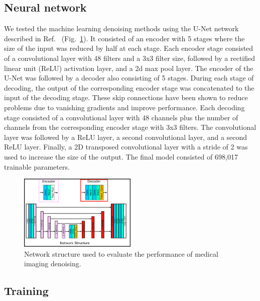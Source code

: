 \documentclass[12pt]{spieman}
\begin{document}
\begin{spacing}{2}
\subsection{Neural network}
We tested the machine learning denoising methods using the U-Net network described in Ref.~\cite{Lehtinen2018a} (Fig.~\ref{fig:netStructure}). It consisted of an encoder with 5 stages where the size of the input was reduced by half at each stage. Each encoder stage consisted of a convolutional layer with 48 filters and a 3x3 filter size, followed by a rectified linear unit (ReLU) activation layer, and a 2d max pool layer. The encoder of the U-Net was followed by a decoder also consisting of 5 stages. During each stage of decoding, the output of the corresponding encoder stage was concatenated to the input of the decoding stage. These skip connections have been shown to reduce problems due to vanishing gradients and improve performance\cite{He_2016_CVPR}. Each decoding stage consisted of a convolutional layer with 48 channels plus the number of channels from the corresponding encoder stage with 3x3 filters. The convolutional layer was followed by a ReLU layer, a second convolutional layer, and a second ReLU layer. Finally, a 2D transposed convolutional layer with a stride of 2 was used to increase the size of the output. The final model consisted of 698,017 trainable parameters.

\begin{figure}[htb]
	\begin{center}
	\includegraphics[width=0.5\textwidth]{networkStructure}
	\caption{\label{fig:netStructure}Network structure used to evaluate the performance of medical imaging denoising.}
	\end{center}
\end{figure}

\subsection{Training}


\end{spacing}
\end{document}
